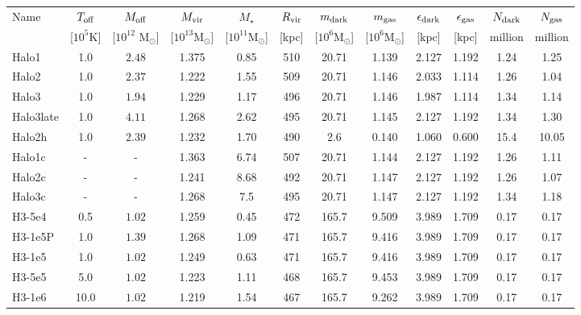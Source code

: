 \documentclass[useAMS,usenatbib]{mnras}
\begin{document}
\begin{table*}
  \centering
  \begin{tabular}{l|c|c|c|c|c|c|c|c|c|c|c}
\hline
Name & $T_{\rm off}$ & $M_{\rm off}$ & $M_{\rm vir}$  & $M_{\star}$
    & $R_{\rm vir}$  & $m_{\rm dark}$ & $m_{\rm gas}$
& $\epsilon_{\rm dark}$ & $\epsilon_{\rm gas}$ & $N_{\rm dark}$ & $N_{\rm gas}$\\
& [$10^5$K] & [$10^{12}$ M$_{\odot}$] & [$10^{13} $M$_{\odot}$] &
                                                                  [$10^{11}
                                                                  $M$_{\odot}$]
    & [kpc] & [$10^6 $M$_{\odot}$] & [$10^6 $M$_{\odot}$]
& [kpc] &[kpc] & million & million\\
\hline
Halo1       & 1.0 & $2.48$ & 1.375 & 0.85 & 510 & 20.71 & 1.139 & 2.127 & 1.192 & 1.24 & 1.25 \\
Halo2       & 1.0 & $2.37$ & 1.222 &1.55 & 509 & 20.71 & 1.146 & 2.033 & 1.114 & 1.26 & 1.04 \\ 
Halo3       & 1.0 & $1.94$ & 1.229 & 1.17 & 496 & 20.71 & 1.146 & 1.987 & 1.114
                                               & 1.34 & 1.14 \\
Halo3late       & 1.0 & $4.11$ & 1.268 & 2.62 & 495 & 20.71 & 1.145 & 2.127 & 1.192 & 1.34 & 1.30 \\
Halo2h & 1.0 & $2.39$ & 1.232 & 1.70 & 490 & 2.6   & 0.140 & 1.060 & 0.600 & 15.4 & 10.05\\
\hline
Halo1c       & - & - & 1.363 & 6.74 & 507 & 20.71 & 1.144 & 2.127 & 1.192 & 1.26 & 1.11 \\
Halo2c       & - & - & 1.241 & 8.68 & 492 & 20.71 & 1.147 & 2.127 & 1.192 & 1.26 & 1.07 \\ 
Halo3c       & - & - & 1.268 & 7.5 & 495 & 20.71 & 1.147 & 2.127 & 1.192 & 1.34 & 1.18 \\
\hline
H3-5e4   & 0.5 & $1.02$ & 1.259 & 0.45 &  472 & 165.7 & 9.509 & 3.989 & 1.709 & 0.17 & 0.17\\
H3-1e5P   & 1.0  & $1.39$ & 1.268 & 1.09 & 471 & 165.7 & 9.416 & 3.989 & 1.709
                                               & 0.17 & 0.17\\
H3-1e5   & 1.0  & $1.02$ & 1.249 & 0.63 & 471 & 165.7 & 9.416 & 3.989 & 1.709 & 0.17 & 0.17\\
H3-5e5   & 5.0  & $1.02$ & 1.223 & 1.11 & 468 & 165.7 & 9.453 & 3.989 & 1.709 & 0.17 & 0.17\\
H3-1e6   & 10.0 & $1.02$ & 1.219 & 1.54 & 467 & 165.7 & 9.262 & 3.989 & 1.709 & 0.17 & 0.17\\

\end{tabular}
\end{table*}
\end{document}
